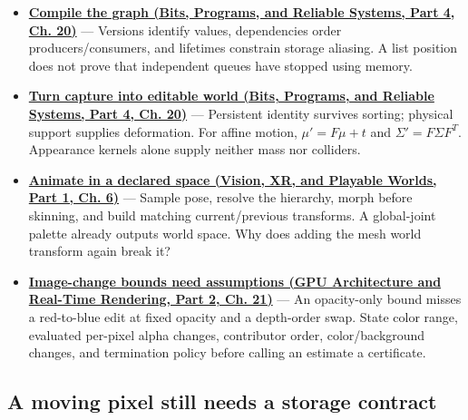 \begin{itemize}
\item
  \textbf{\href{../01-Bits-Programs-and-Reliable-Systems-P04/main.pdf\#06-engine-ii-ch042-compile-a-render-graph-before-executing-it}{Compile the graph (Bits, Programs, and Reliable Systems, Part 4, Ch. 20)}} --- Versions identify values, dependencies order producers/consumers, and lifetimes constrain storage aliasing. A list position does not prove that independent queues have stopped using memory.
\item
  \textbf{\href{../01-Bits-Programs-and-Reliable-Systems-P04/main.pdf\#06-engine-ii-ch042-rendering-identity-becomes-world-identity-only-through-an-explicit-bridge}{Turn capture into editable world (Bits, Programs, and Reliable Systems, Part 4, Ch. 20)}} --- Persistent identity survives sorting; physical support supplies deformation. For affine motion, \(\mu'=F\mu+t\) and \(\Sigma'=F\Sigma F^T\). Appearance kernels alone supply neither mass nor colliders.
\item
  \textbf{\href{../07-Vision-XR-and-Playable-Worlds-P01/main.pdf\#04-visual-computing-ii-ch037-build-a-pose-first-then-deform-the-surface}{Animate in a declared space (Vision, XR, and Playable Worlds, Part 1, Ch. 6)}} --- Sample pose, resolve the hierarchy, morph before skinning, and build matching current/previous transforms. A global-joint palette already outputs world space. Why does adding the mesh world transform again break it?
\item
  \textbf{\href{../06-GPU-Architecture-and-Real-Time-Rendering-P02/main.pdf\#06-engine-ii-ch045-an-image-change-certificate-must-name-the-edits-it-covers}{Image-change bounds need assumptions (GPU Architecture and Real-Time Rendering, Part 2, Ch. 21)}} --- An opacity-only bound misses a red-to-blue edit at fixed opacity and a depth-order swap. State color range, evaluated per-pixel alpha changes, contributor order, color/background changes, and termination policy before calling an estimate a certificate.
\end{itemize}

\subsection{A moving pixel still needs a storage contract}\label{appendix-a8f634b076b5-a-moving-pixel-still-needs-a-storage-contract}

\hypertarget{appendix-a8f634b076b5-a-moving-pixel-still-needs-a-storage-contract}{}

